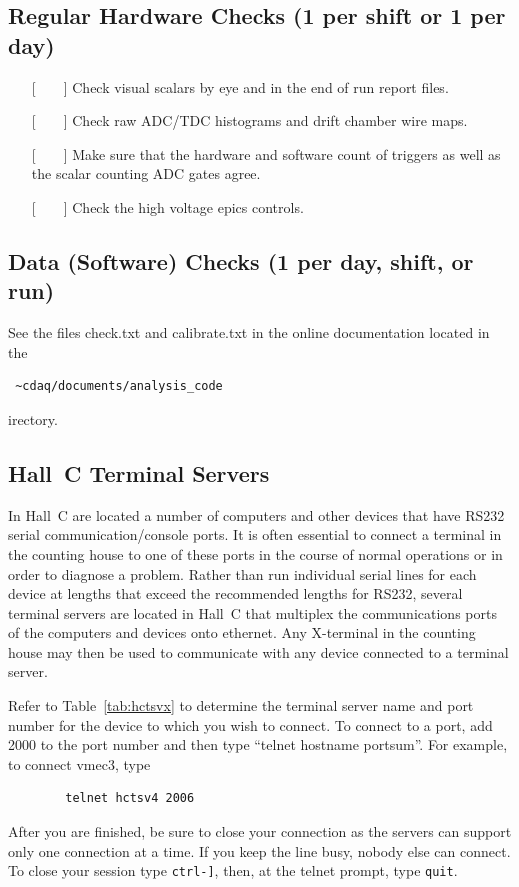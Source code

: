 \subsection {Regular Hardware Checks (1 per shift or 1 per day)}

\begin{itemize}
\item[{[~~~~]}]{Check visual scalars by eye and in the end of run report files.}
\item[{[~~~~]}]{Check raw ADC/TDC histograms and drift chamber wire maps.}
\item[{[~~~~]}]{Make sure that the hardware and software count of triggers as well
as the scalar counting ADC gates agree.}
\item[{[~~~~]}]{Check the high voltage epics controls.}
\end{itemize}

\subsection {Data (Software) Checks (1 per day, shift, or run)}

See the files check.txt and calibrate.txt in the online documentation
located in the
\begin{verbatim} ~cdaq/documents/analysis_code \end{verbatim}
irectory.

\subsection{Hall~C Terminal Servers}
%
In Hall~C
are located a number of computers and other devices that have
RS232 serial communication/console ports.  It is often essential to connect
a terminal in the counting house to one of these ports
in the course of normal operations or
in order to diagnose
a problem.  Rather than run individual
serial lines for each device at lengths that exceed the recommended lengths
for RS232, several terminal servers are located in Hall~C that multiplex
the communications ports of the computers and devices onto ethernet.  Any
X-terminal in the counting house may then be used to communicate with
any device connected to a terminal server. 

Refer to Table~\ref{tab:hctsvx} to determine the terminal server name and port
number for the device to which you wish to connect. 
To connect to a port, add 2000 to the port number and then type
``telnet hostname portsum''.  For example, to connect vmec3, type
\begin{verbatim}
        telnet hctsv4 2006
\end{verbatim}
After you are finished, be sure to close your connection as the servers
can support only one connection at a time. If you keep the line busy,
nobody else can connect. To close your session type {\tt \verb|ctrl-]|},
then, at the telnet prompt, type {\tt quit}.

